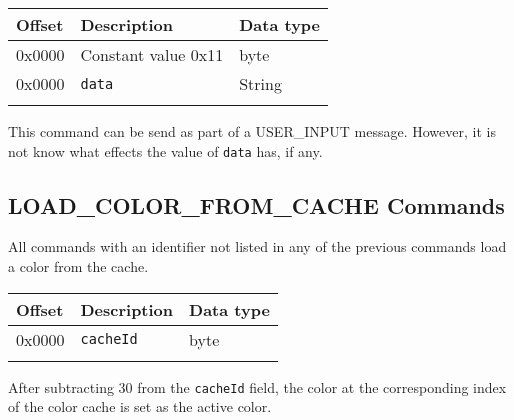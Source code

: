 \documentclass{article}
\newcommand{\field}[1]{\textcolor{fieldColor}{\texttt{#1}}}
\newenvironment{bytelisting}
{\ttfamily \begin{center} \begin{tabular}{l l l} Offset & Description & Data type \\ \hline}
{\normalfont \end{tabular} \end{center}}
\begin{document}
\begin{bytelisting}
0x0000 & Constant value 0x11 & byte \\
0x0000 & \field{data} & String \\
\end{bytelisting}

This command can be send as part of a USER\_INPUT message. However, it is not know what effects the value of \field{data} has, if any.

\subsection{LOAD\_COLOR\_FROM\_CACHE Commands}
All commands with an identifier not listed in any of the previous commands load a color from the cache. 

\begin{bytelisting}
0x0000 & \field{cacheId} & byte \\
\end{bytelisting}

After subtracting 30 from the \field{cacheId} field, the color at the corresponding index of the color cache is set as the active color.
\end{document}
